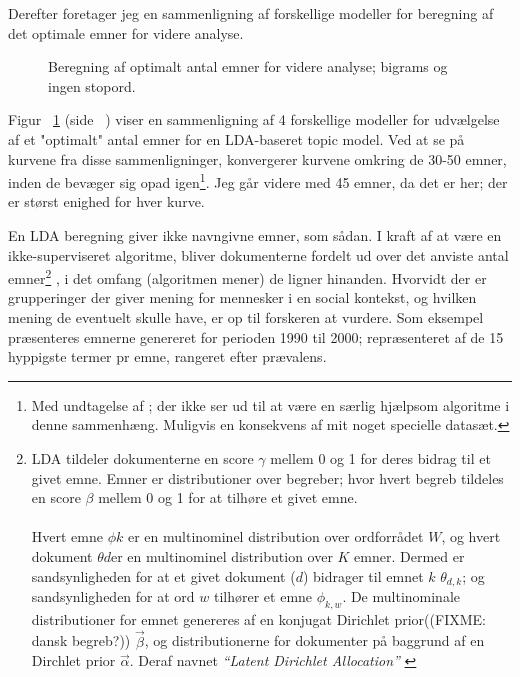 Derefter foretager jeg en sammenligning af forskellige modeller for beregning af det optimale emner for videre analyse.

\begin{figure}

\caption{Beregning af optimalt antal emner for videre analyse; bigrams og ingen stopord.}
\label{fig:modelsFull}
\end{figure}

Figur ~\ref{fig:modelsFull} (side ~\pageref{fig:modelsFull}) viser en sammenligning af 4 forskellige modeller for udvælgelse af et "optimalt" antal emner for en LDA-baseret topic model.
Ved at se på kurvene fra disse sammenligninger, konvergerer kurvene omkring de 30-50 emner, inden de bevæger sig opad igen\footnote{Med undtagelse af \autocite{deveaudAccurateEffectiveLatent2014}; der ikke ser ud til at være en særlig hjælpsom algoritme i denne sammenhæng. Muligvis en konsekvens af mit noget specielle datasæt.}.
Jeg går videre med 45 emner, da det er her; der er størst enighed for hver kurve.

En LDA beregning giver ikke navngivne emner, som sådan.
I kraft af at være en ikke-superviseret algoritme, bliver dokumenterne fordelt ud over det anviste antal emner\footnote{LDA tildeler dokumenterne en score $\gamma$ mellem 0 og 1 for deres bidrag til et givet emne. Emner er distributioner over begreber; hvor hvert begreb tildeles en score $\beta$ mellem 0 og 1 for at tilhøre et givet emne. \\ \\ Hvert emne $\phi k$ er en multinominel distribution over ordforrådet $W$, og hvert dokument $\theta  d$er en multinominel distribution over $K$ emner. Dermed er sandsynligheden for at et givet dokument ($d$) bidrager til emnet $k$ $\theta _{d,k}$; og sandsynligheden for at ord $w$ tilhører et emne $\phi _{k,w}$. De multinominale distributioner for emnet genereres af en konjugat Dirichlet prior((FIXME: dansk begreb?)) $\overrightarrow{\beta}$, og distributionerne for dokumenter på baggrund af en Dirchlet prior $\overrightarrow{\alpha}$. Deraf navnet \textit{“Latent Dirichlet Allocation”} \autocite[s.65f]{deveaudAccurateEffectiveLatent2014}} , i det omfang (algoritmen mener) de ligner hinanden.
Hvorvidt der er grupperinger der giver mening for mennesker i en social kontekst, og hvilken mening de eventuelt skulle have, er op til forskeren at vurdere.
Som eksempel præsenteres emnerne genereret for perioden 1990 til 2000; repræsenteret af de 15 hyppigste termer pr emne, rangeret efter prævalens.

